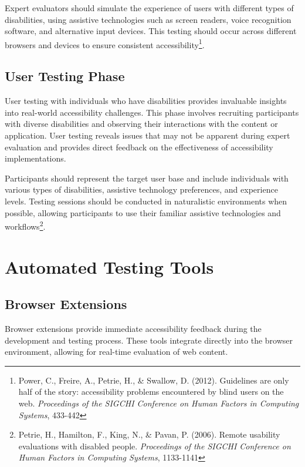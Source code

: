 Expert evaluators should simulate the experience of users with different types of disabilities, using assistive technologies such as screen readers, voice recognition software, and alternative input devices. This testing should occur across different browsers and devices to ensure consistent accessibility\footnote{Power, C., Freire, A., Petrie, H., \& Swallow, D. (2012). Guidelines are only half of the story: accessibility problems encountered by blind users on the web. \textit{Proceedings of the SIGCHI Conference on Human Factors in Computing Systems}, 433-442}.

\subsection{User Testing Phase}

User testing with individuals who have disabilities provides invaluable insights into real-world accessibility challenges. This phase involves recruiting participants with diverse disabilities and observing their interactions with the content or application. User testing reveals issues that may not be apparent during expert evaluation and provides direct feedback on the effectiveness of accessibility implementations.

Participants should represent the target user base and include individuals with various types of disabilities, assistive technology preferences, and experience levels. Testing sessions should be conducted in naturalistic environments when possible, allowing participants to use their familiar assistive technologies and workflows\footnote{Petrie, H., Hamilton, F., King, N., \& Pavan, P. (2006). Remote usability evaluations with disabled people. \textit{Proceedings of the SIGCHI Conference on Human Factors in Computing Systems}, 1133-1141}.

\section{Automated Testing Tools}
\label{sec:automated-tools}

\subsection{Browser Extensions}

Browser extensions provide immediate accessibility feedback during the development and testing process. These tools integrate directly into the browser environment, allowing for real-time evaluation of web content.

